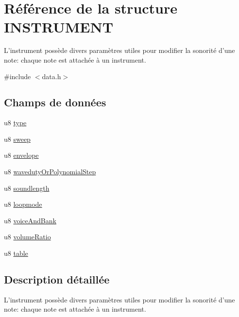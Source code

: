 \hypertarget{struct_i_n_s_t_r_u_m_e_n_t}{
\section{Référence de la structure INSTRUMENT}
\label{struct_i_n_s_t_r_u_m_e_n_t}
}


L'instrument possède divers paramètres utiles pour modifier la sonorité d'une note: chaque note est attachée à un instrument.  




{\ttfamily \#include $<$data.h$>$}

\subsection*{Champs de données}
\begin{DoxyCompactItemize}
\item 
u8 \hyperlink{struct_i_n_s_t_r_u_m_e_n_t_a34923af2855ec28604554d526eb97c33}{type}
\item 
u8 \hyperlink{struct_i_n_s_t_r_u_m_e_n_t_a8631f5f71803aa58cd851af4919cd4be}{sweep}
\item 
u8 \hyperlink{struct_i_n_s_t_r_u_m_e_n_t_a9e90c973b09de93181dc92b2479499fb}{envelope}
\item 
u8 \hyperlink{struct_i_n_s_t_r_u_m_e_n_t_a54aabf48ce8e591830868fe225157dee}{wavedutyOrPolynomialStep}
\item 
u8 \hyperlink{struct_i_n_s_t_r_u_m_e_n_t_a95a669db24a383bd5d83f637e4bc9f0c}{soundlength}
\item 
u8 \hyperlink{struct_i_n_s_t_r_u_m_e_n_t_a8cbe33bff0d7c544428e55850ea1bba9}{loopmode}
\item 
u8 \hyperlink{struct_i_n_s_t_r_u_m_e_n_t_a6126b24ce345ae666412f07d5528d164}{voiceAndBank}
\item 
u8 \hyperlink{struct_i_n_s_t_r_u_m_e_n_t_a1338e4097c1cb451ef7d5a9b7d3c54d7}{volumeRatio}
\item 
u8 \hyperlink{struct_i_n_s_t_r_u_m_e_n_t_a5a6e736101953ab6b0f9cfc7e7f40a59}{table}
\end{DoxyCompactItemize}


\subsection{Description détaillée}
L'instrument possède divers paramètres utiles pour modifier la sonorité d'une note: chaque note est attachée à un instrument. 

